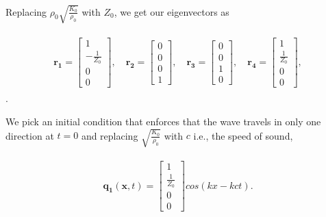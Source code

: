 Replacing $\rho_0 \sqrt{\frac{K_0}{\rho_0}}$ with $Z_0$, we get our eigenvectors as

\begin{align}
    \begin{split}
    \mathbf{r_1} = \begin{bmatrix}
        1 \\
-\frac{1}{Z_0} \\
0 \\
0
        \end{bmatrix}, \quad
        \mathbf{r_2} = \begin{bmatrix}
            0 \\
0 \\
0 \\
1
            \end{bmatrix}, \quad
            \mathbf{r_3} = \begin{bmatrix}
                0 \\
                0 \\
                1 \\
                0
                \end{bmatrix}, \quad
                \mathbf{r_4} = \begin{bmatrix}
                    1 \\
                    \frac{1}{Z_0} \\
                    0 \\
                    0                    
                \end{bmatrix},
    \end{split}
\end{align} .

We pick an initial condition that enforces that the wave travels in only one direction at $t=0$ and replacing $\sqrt{\frac{K_{0}}{\rho_{0}}}$ with $c$ i.e.,
the speed of sound,

\begin{align}
    \begin{split}
        \mathbf{q_1}\left(\mathbf{x}, t\right) = \begin{bmatrix}
            1 \\
            \frac{1}{Z_0} \\
            0 \\
            0
            \end{bmatrix} cos\left(kx - k ct\right) .
    \end{split}
\end{align}

